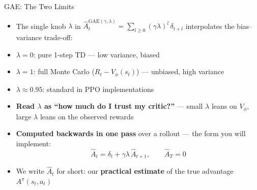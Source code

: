 \begin{frame}{GAE: The Two Limits}
\begin{itemize}
    \item The single knob $\lambda$ in $\hat{A}^{\mathrm{GAE}(\gamma,\lambda)}_t = \sum_{l \geq 0} (\gamma\lambda)^l\, \delta_{t+l}$ interpolates the bias--variance trade-off:
    \item $\lambda = 0$: pure 1-step TD --- low variance, biased
    \item $\lambda = 1$: full Monte Carlo ($R_t - V_\phi(s_t)$) --- unbiased, high variance
    \item $\lambda \approx 0.95$: standard in PPO implementations
    \item \textbf{Read $\lambda$ as ``how much do I trust my critic?''} --- small $\lambda$ leans on $V_\phi$, large $\lambda$ leans on the observed rewards
    \pause
    \item \textbf{Computed backwards in one pass} over a rollout --- the form you will implement:
    $$\hat{A}_t = \delta_t + \gamma\lambda\, \hat{A}_{t+1}, \qquad \hat{A}_T = 0$$
    \item We write $\hat{A}_t$ for short: our \textbf{practical estimate} of the true advantage $A^{\pi}(s_t,a_t)$
\end{itemize}
\end{frame}
